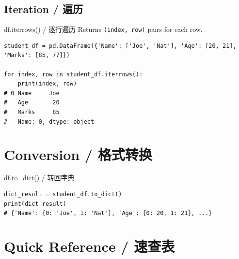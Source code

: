 \documentclass[11pt,a4paper]{report}
\let\oldtexttt\texttt
\renewcommand{\texttt}[1]{\textcolor{mainblue}{\oldtexttt{#1}}}
\begin{document}
\subsection{Iteration / 遍历}

\begin{examplebox}{df.iterrows() / 逐行遍历}
    Returns \texttt{(index, row)} pairs for each row.
\begin{lstlisting}
student_df = pd.DataFrame({'Name': ['Joe', 'Nat'], 'Age': [20, 21], 'Marks': [85, 77]})

for index, row in student_df.iterrows():
    print(index, row)
# 0 Name     Joe
#   Age       20
#   Marks     85
#   Name: 0, dtype: object
\end{lstlisting}
\end{examplebox}

\section{Conversion / 格式转换}

\begin{examplebox}{df.to\_dict() / 转回字典}
\begin{lstlisting}
dict_result = student_df.to_dict()
print(dict_result)
# {'Name': {0: 'Joe', 1: 'Nat'}, 'Age': {0: 20, 1: 21}, ...}
\end{lstlisting}
\end{examplebox}

\section{Quick Reference / 速查表}
\end{document}
